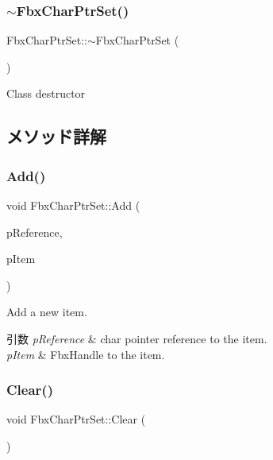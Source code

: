 \subsubsection{\texorpdfstring{$\sim$\+Fbx\+Char\+Ptr\+Set()}{~FbxCharPtrSet()}}
{\footnotesize\ttfamily Fbx\+Char\+Ptr\+Set\+::$\sim$\+Fbx\+Char\+Ptr\+Set (\begin{DoxyParamCaption}{ }\end{DoxyParamCaption})}



Class destructor 



\subsection{メソッド詳解}
\mbox{\label{class_fbx_char_ptr_set_a9efd684cdc4dbb93168c91fb717e89b1}} 
\subsubsection{\texorpdfstring{Add()}{Add()}}
{\footnotesize\ttfamily void Fbx\+Char\+Ptr\+Set\+::\+Add (\begin{DoxyParamCaption}\item[{const char $\ast$}]{p\+Reference,  }\item[{Fbx\+Handle}]{p\+Item }\end{DoxyParamCaption})}

Add a new item. 
\begin{DoxyParams}{引数}
{\em p\+Reference} & char pointer reference to the item. \\
\hline
{\em p\+Item} & Fbx\+Handle to the item. \\
\hline
\end{DoxyParams}
\mbox{\label{class_fbx_char_ptr_set_a868b8f961a3e3f5d4c4c5f77009e5947}} 
\subsubsection{\texorpdfstring{Clear()}{Clear()}}
{\footnotesize\ttfamily void Fbx\+Char\+Ptr\+Set\+::\+Clear (\begin{DoxyParamCaption}{ }\end{DoxyParamCaption})}



